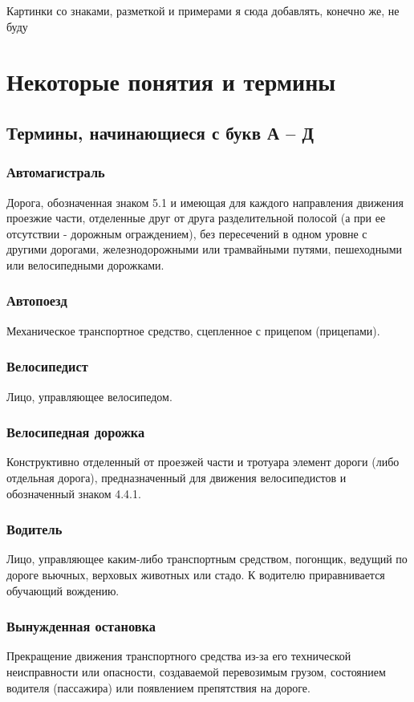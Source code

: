 \documentclass[russian,english,12pt,a4paper,reqno,dviphfm,oneside]{book}
\begin{document}
\vfill{\small{{Картинки со знаками, разметкой и примерами я сюда добавлять, конечно же, не буду}}

\chapter{Некоторые понятия и термины}

\section{Термины, начинающиеся с букв А -- Д}

\subsection{Автомагистраль} 
Дорога, обозначенная знаком 5.1 и имеющая для каждого направления движения проезжие части, отделенные друг от друга разделительной полосой (а при ее отсутствии - дорожным ограждением), без пересечений в одном уровне с другими дорогами, железнодорожными или трамвайными путями, пешеходными или велосипедными дорожками.

\subsection{Автопоезд}
Механическое транспортное средство, сцепленное с прицепом (прицепами).

\subsection{Велосипедист}
Лицо, управляющее велосипедом.

\subsection{Велосипедная дорожка}
Конструктивно отделенный от проезжей части и тротуара элемент дороги (либо отдельная дорога), предназначенный для движения велосипедистов и обозначенный знаком 4.4.1.

\subsection{Водитель}
Лицо, управляющее каким-либо транспортным средством, погонщик, ведущий по дороге вьючных, верховых животных или стадо. К водителю приравнивается обучающий вождению.

\subsection{Вынужденная остановка}
Прекращение движения транспортного средства из-за его технической неисправности или опасности, создаваемой перевозимым грузом, состоянием водителя (пассажира) или появлением препятствия на дороге.

}
\end{document}
